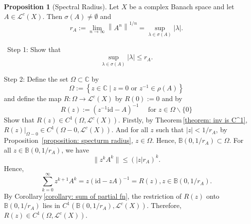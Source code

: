\documentclass[12pt,a4paper]{book}
\newenvironment{prooff}{{\noindent\it\textcolor{cyan!40!black}{Proof}:}\,}{\par}
\newcommand{\bb}[1]{\mathbb{#1}}
\newcommand{\norm}[1]{\|{#1}\|}
\theoremstyle{definition}
\newtheorem{prop}[defn]{Proposition}
\begin{document}
\begin{prop}[Spectral Radius]
    Let $X$ be a complex Banach space and 
    let $A \in \mathcal{L}^c(X)$. Then $\sigma(A) \neq \emptyset$ and
    $$
    r_A:=\lim _{n \rightarrow \infty}\left\|A^n\right\|^{1 / n}=\sup _{\lambda \in \sigma(A)}|\lambda| .
    $$    
\end{prop}
\begin{prooff}
    Step 1: Show that 
    $$
    \sup _{\lambda \in \sigma(A)}|\lambda| \leq r_A.
    $$
    
    Step 2: 
    Define the set $\Omega \subset \mathbb{C}$ by
    $$
    \Omega:=\left\{z \in \mathbb{C} \mid z=0 \text { or } z^{-1} \in \rho(A)\right\}
    $$
    and define the map $R: \Omega \rightarrow \mathcal{L}^c(X)$ by $R(0):=0$ and by
    $$
    R(z):=\left(z^{-1}\text{id}-A\right)^{-1} \quad \text { for } z \in \Omega \backslash\{0\}
    $$
    Show that $R(z)\in C^1(\Omega,\mathcal{L}^c(X))$. Firstly, by Theorem\,\ref{theorem: inv is C^1}, 
    $\left.R(z)\right|_{\Omega-0}\in C^1(\Omega-0,\mathcal{L}^c(X))$. And for all 
    $z$ such that $|z|<1/r_A$, by Proposition
    \,\ref{proposition: specturm radius}, $z\in \Omega$. Hence, $\bb{B}(0,1/r_A)\subset \Omega$. 
    For all $z\in \bb{B}(0,1/r_A)$, we have 
    \begin{equation*}
        \norm{z^kA^k}\le (|z|r_A)^k.  
    \end{equation*}
    Hence, 
    \begin{equation*}
        \sum_{k=0}^\infty z^{k+1}A^k=z(\text{id}-zA)^{-1}=R(z),z\in \bb{B}(0,1/r_A).
    \end{equation*}
    By Corollary\,\ref{corollary: sum of partial fn}, the restriction of $R(z)$ onto $\bb{B}(0,1/r_A)$ lies in 
    $C^1(\bb{B}(0,1/r_A),\mathcal{L}^c(X))$. 
    Therefore, $R(z)\in C^1(\Omega,\mathcal{L}^c(X))$. 
    

\end{prooff}
\end{document}
